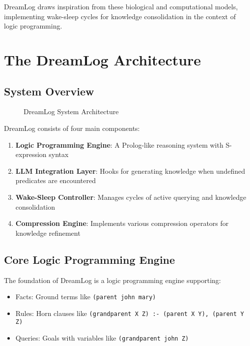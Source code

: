 \documentclass[10pt,conference]{IEEEtran}
\begin{document}
DreamLog draws inspiration from these biological and computational models, implementing wake-sleep cycles for knowledge consolidation in the context of logic programming.

\section{The DreamLog Architecture}

\subsection{System Overview}

\begin{figure}[h]
\centering
\caption{DreamLog System Architecture}
\label{fig:architecture}
\end{figure}

DreamLog consists of four main components:

\begin{enumerate}
\item \textbf{Logic Programming Engine}: A Prolog-like reasoning system with S-expression syntax
\item \textbf{LLM Integration Layer}: Hooks for generating knowledge when undefined predicates are encountered
\item \textbf{Wake-Sleep Controller}: Manages cycles of active querying and knowledge consolidation
\item \textbf{Compression Engine}: Implements various compression operators for knowledge refinement
\end{enumerate}

\subsection{Core Logic Programming Engine}

The foundation of DreamLog is a logic programming engine supporting:
\begin{itemize}
\item Facts: Ground terms like \texttt{(parent john mary)}
\item Rules: Horn clauses like \texttt{(grandparent X Z) :- (parent X Y), (parent Y Z)}
\item Queries: Goals with variables like \texttt{(grandparent john Z)}
\end{itemize}
\end{document}

